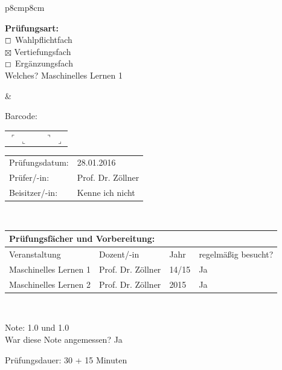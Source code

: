 \documentclass[a4paper]{article}
\newcommand{\Fach}{Maschinelles Lernen 1}
\newcommand{\Pruefungsdatum}{28.01.2016}    %
\newcommand{\Pruefer}{Prof. Dr. Zöllner}
\newcommand{\Beisitzer}{Kenne ich nicht}
\newcommand{\Note}{1.0 und 1.0}
\newcommand{\Dauer}{30 + 15} %
\begin{document}
\begin{tabular}{p{8cm}p{8cm}}
\begin{flushleft}
   \textbf{Prüfungsart:}\\
   $\boxempty$ Wahlpflichtfach  \\
   $\boxtimes$ Vertiefungsfach  \\
   $\boxempty$ Ergänzungsfach  \\[0.5cm]
   Welches? \Fach
  \end{flushleft}
  &
  \begin{center}
   Barcode:
   \begin{tabular}{p{0.2cm}p{6.8cm}p{0.2cm}}
   $\ulcorner$
   \vskip 2cm
   $\llcorner$ & & $\urcorner$
   \vskip 2cm
   $\lrcorner$ \\
   \end{tabular}
  \end{center}
  \vskip 0.5cm
  \begin{flushright}
  \begin{tabular}{ll}
   Prüfungsdatum:   & \Pruefungsdatum \\[0.5cm]
   Prüfer/-in:      & \Pruefer \\[0.5cm]
   Beisitzer/-in:   & \Beisitzer \\
  \end{tabular}
  \end{flushright} \\
 \end{tabular}

 \begin{tabular}{|p{8.2cm}|p{3cm}|p{1cm}|p{3.5cm}|}
  \multicolumn{4}{l}{\bfseries Prüfungsfächer und Vorbereitung: } \\[0.2cm]
  \hline
  Veranstaltung & Dozent/-in  & Jahr & regelmäßig besucht? \\
  \hline
  \hline
  \Fach & \Pruefer & 14/15 &  Ja \\[0.2cm]
  \hline
  Maschinelles Lernen 2 & \Pruefer & 2015 &  Ja \\[0.2cm]
  \hline
 \end{tabular} \\[0.5cm]

\begin{multicols}{2}
Note: \Note\\[0.5cm]
War diese Note angemessen?
Ja

\columnbreak
Prüfungsdauer: \Dauer{} Minuten \\[0.5cm]
\end{multicols}
\end{document}
